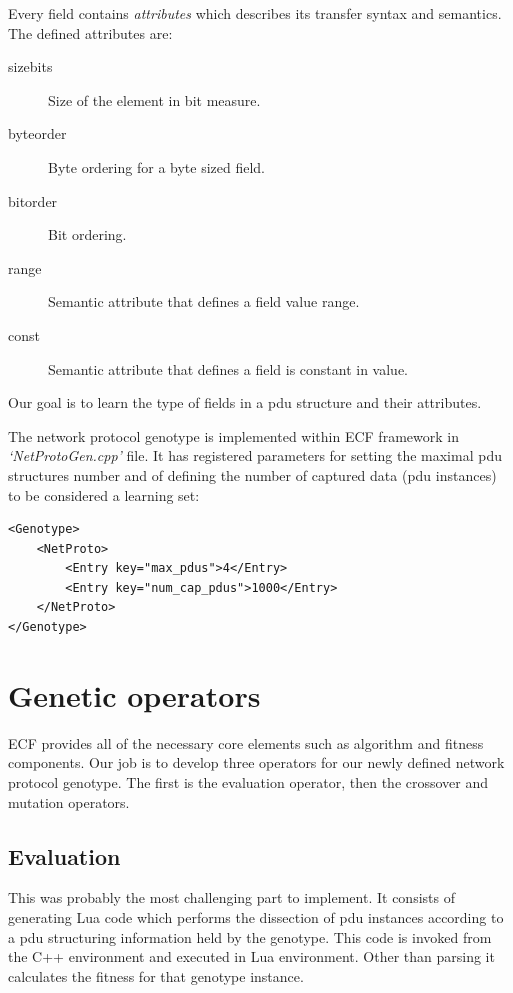\documentclass[times, utf8, diplomski]{fer}
\begin{document}
Every field contains \emph{attributes} which describes its transfer syntax and semantics.
The defined attributes are:
\begin{description}
	\item[size\textunderscore{}bits] Size of the element in bit measure.
	\item[byte\textunderscore{}order] Byte ordering for a byte sized field.
	\item[bit\textunderscore{}order] Bit ordering.
	\item[range] Semantic attribute that defines a field value range.
	\item[const] Semantic attribute that defines a field is constant in value.
\end{description}

Our goal is to learn the type of fields in a pdu structure and their attributes.

The network protocol genotype is implemented within ECF framework in \emph{`NetProtoGen.cpp'}
file. It has registered parameters for setting the maximal pdu structures number
and of defining the number of captured data (pdu instances) to be considered a 
learning set:

\lstset{language=XML}
\lstset{basicstyle=\tiny}
\begin{lstlisting}[frame=tb]
<Genotype>
	<NetProto>
		<Entry key="max_pdus">4</Entry>
		<Entry key="num_cap_pdus">1000</Entry>
	</NetProto>
</Genotype>
\end{lstlisting}


\section{Genetic operators}
ECF provides all of the necessary core elements such as algorithm and fitness
components. Our job is to develop three operators for our newly defined network
protocol genotype. The first is the evaluation operator, then the crossover and
mutation operators.

\subsection{Evaluation}
This was probably the most challenging part to implement. It consists of generating
Lua code which performs the dissection of pdu instances according to a pdu structuring 
information held by the genotype. This code is invoked from the C++ environment
and executed in Lua environment. Other than parsing it calculates the fitness 
for that genotype instance.
\end{document}
